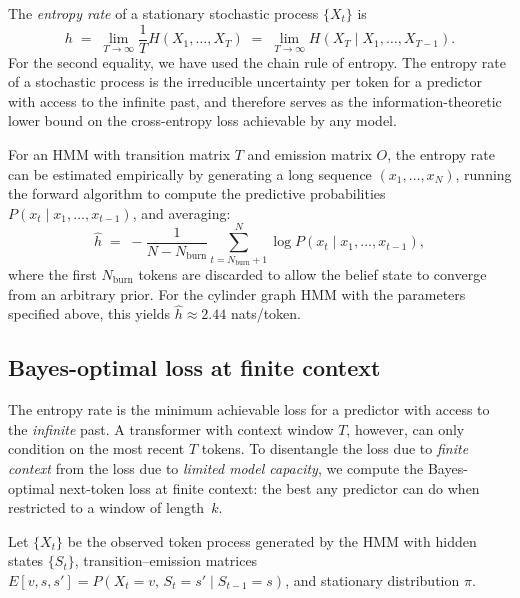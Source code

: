 \documentclass[11pt]{article}
\begin{document}
The \emph{entropy rate} of a stationary stochastic process $\{X_t\}$ is
\begin{equation}
  h \;=\; \lim_{T \to \infty} \frac{1}{T} H(X_1, \dots, X_T)
    \;=\; \lim_{T \to \infty} H(X_T \mid X_1, \dots, X_{T-1}).
\end{equation}
For the second equality, we have used the chain rule of entropy. The entropy rate of a stochastic process is the irreducible uncertainty per token for a predictor with access to the infinite past, and therefore serves as the information-theoretic lower bound on the cross-entropy loss achievable by any model.

For an HMM with transition matrix $T$ and emission matrix $O$, the
entropy rate can be estimated empirically by generating a long sequence
$(x_1, \dots, x_N)$, running the forward algorithm to compute the
predictive probabilities $P(x_t \mid x_1, \dots, x_{t-1})$, and
averaging:
\begin{equation}
  \hat{h} \;=\; -\frac{1}{N - N_{\mathrm{burn}}}
    \sum_{t=N_{\mathrm{burn}}+1}^{N} \log P(x_t \mid x_1, \dots, x_{t-1}),
\end{equation}
where the first $N_{\mathrm{burn}}$ tokens are discarded to allow the
belief state to converge from an arbitrary prior.  For the cylinder
graph HMM with the parameters specified above, this yields \(\hat{h} \approx 2.44\) nats/token.

\subsection{Bayes-optimal loss at finite context}\label{sec:bayes-optimal}

The entropy rate is the minimum achievable loss for a predictor with
access to the \emph{infinite} past.  A transformer with context window $T$,
however, can only condition on the most recent $T$ tokens.  To
disentangle the loss due to \emph{finite context} from the loss due to
\emph{limited model capacity}, we compute the Bayes-optimal next-token
loss at finite context: the best any predictor can do when restricted to
a window of length~$k$.

Let $\{X_t\}$ be the observed token process generated by the HMM with
hidden states $\{S_t\}$, transition--emission matrices
$E[v,s,s'] = P(X_t{=}v,\, S_t{=}s' \mid S_{t-1}{=}s)$, and stationary
distribution $\pi$.
\end{document}
